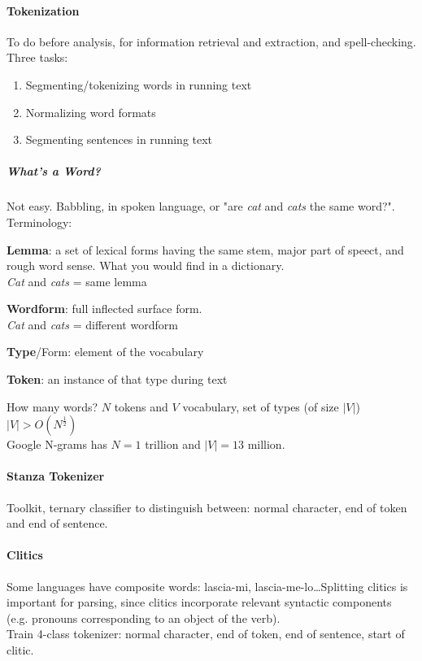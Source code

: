 \documentclass[10pt]{report}
\begin{document}
\paragraph{Tokenization} To do before analysis, for information retrieval and extraction, and spell-checking. Three tasks:\begin{enumerate}	
	\item Segmenting/tokenizing words in running text
	\item Normalizing word formats
	\item Segmenting sentences in running text
\end{enumerate}
\subparagraph{What's a Word?} Not easy. Babbling, in spoken language, or "are \textit{cat} and \textit{cats} the same word?".\\
Terminology:
\begin{list}{}{}
	\item \textbf{Lemma}: a set of lexical forms having the same stem, major part of speect, and rough word sense. What you would find in a dictionary.\\
	\textit{Cat} and \textit{cats} = same lemma
	\item \textbf{Wordform}: full inflected surface form.\\
	\textit{Cat} and \textit{cats} = different wordform
	\item \textbf{Type}/Form: element of the vocabulary
	\item \textbf{Token}: an instance of that type during text
\end{list}
How many words? $N$ tokens and $V$ vocabulary, set of types (of size $|V|$)\\$|V|>O(N^{\frac{1}{2}})$\\
Google N-grams has $N = 1$ trillion and $|V| = 13$ million.
\paragraph{Stanza Tokenizer} Toolkit, ternary classifier to distinguish between: normal character, end of token and end of sentence.
\paragraph{Clitics} Some languages have composite words: lascia-mi, lascia-me-lo\ldots Splitting clitics is important for parsing, since clitics incorporate relevant syntactic components (e.g. pronouns corresponding to an object of the verb).\\
Train 4-class tokenizer: normal character, end of token, end of sentence, start of clitic.
\end{document}
